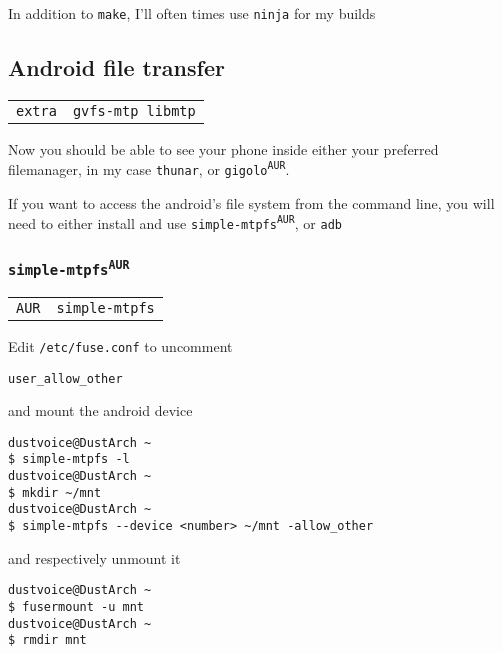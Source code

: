\documentclass[9pt]{report}
\newenvironment{packagetable}
{\begin{longtabu}to \textwidth [b]{X[1,r]|X[1,l]}}
{\end{longtabu}}
\begin{document}
In addition to \texttt{make}, I’ll often times use \texttt{ninja} for my builds



\newpage

\hypertarget{x-android-file-transfer}{\subsection{Android file transfer}}
\begin{packagetable}
    \texttt{extra} & \texttt{gvfs-mtp libmtp} \\ 
\end{packagetable}

Now you should be able to see your phone inside either your preferred filemanager, in my case \texttt{thunar}, or \texttt{gigolo\textsuperscript{\texttt{AUR}}}.


If you want to access the android’s file system from the command line, you will need to either install and use \texttt{simple-mtpfs\textsuperscript{\texttt{AUR}}}, or \texttt{adb}



\newpage

\hypertarget{x-simple-mtpfs-aur}{\subsubsection{\texttt{simple-mtpfs\textsuperscript{\texttt{AUR}}}}}
\begin{packagetable}
    \texttt{AUR} & \texttt{simple-mtpfs} \\ 
\end{packagetable}

Edit \texttt{/etc/fuse.conf} to uncomment


\begin{verbatim}
user_allow_other
\end{verbatim}

and mount the android device


\begin{verbatim}
dustvoice@DustArch ~
$ simple-mtpfs -l
dustvoice@DustArch ~
$ mkdir ~/mnt
dustvoice@DustArch ~
$ simple-mtpfs --device <number> ~/mnt -allow_other
\end{verbatim}

and respectively unmount it


\begin{verbatim}
dustvoice@DustArch ~
$ fusermount -u mnt
dustvoice@DustArch ~
$ rmdir mnt
\end{verbatim}
\end{document}
